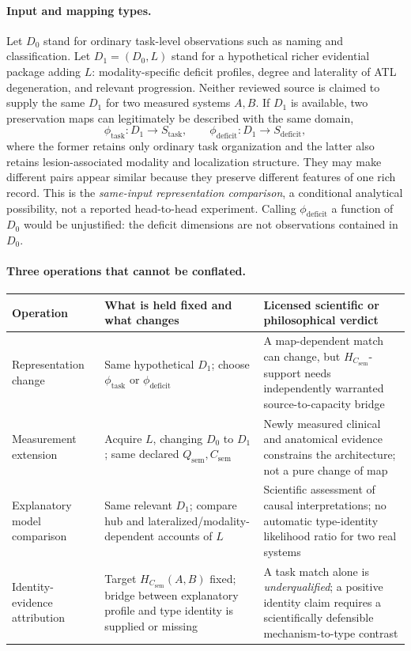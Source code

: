 \documentclass[11pt]{article}
\begin{document}
\paragraph{Input and mapping types.}
Let \(D_0\) stand for ordinary task-level observations such as naming and classification. Let \(D_1=(D_0,L)\) stand for a hypothetical richer evidential package adding \(L\): modality-specific deficit profiles, degree and laterality of ATL degeneration, and relevant progression. Neither reviewed source is claimed to supply the same \(D_1\) for two measured systems \(A,B\). If \(D_1\) is available, two preservation maps can legitimately be described with the same domain,
\[
\phi_{\mathrm{task}}:D_1\longrightarrow S_{\mathrm{task}},
\qquad
\phi_{\mathrm{deficit}}:D_1\longrightarrow S_{\mathrm{deficit}},
\]
where the former retains only ordinary task organization and the latter also retains lesion-associated modality and localization structure. They may make different pairs appear similar because they preserve different features of one rich record. This is the \emph{same-input representation comparison}, a conditional analytical possibility, not a reported head-to-head experiment. Calling \(\phi_{\mathrm{deficit}}\) a function of \(D_0\) would be unjustified: the deficit dimensions are not observations contained in \(D_0\).

\paragraph{Three operations that cannot be conflated.}
\begin{center}
\small
\begin{tabularx}{\textwidth}{>{\raggedright\arraybackslash}p{} X X}
\toprule
Operation & What is held fixed and what changes & Licensed scientific or philosophical verdict\\
\midrule
Representation change & Same hypothetical \(D_1\); choose \(\phi_{\mathrm{task}}\) or \(\phi_{\mathrm{deficit}}\) & A map-dependent match can change, but \(H_{C_{\mathrm{sem}}}\)-support needs independently warranted source-to-capacity bridge\\
Measurement extension & Acquire \(L\), changing \(D_0\) to \(D_1\); same declared \(Q_{\mathrm{sem}},C_{\mathrm{sem}}\) & Newly measured clinical and anatomical evidence constrains the architecture; not a pure change of map\\
Explanatory model comparison & Same relevant \(D_1\); compare hub and lateralized/modality-dependent accounts of \(L\) & Scientific assessment of causal interpretations; no automatic type-identity likelihood ratio for two real systems\\
Identity-evidence attribution & Target \(H_{C_{\mathrm{sem}}}(A,B)\) fixed; bridge between explanatory profile and type identity is supplied or missing & A task match alone is \emph{underqualified}; a positive identity claim requires a scientifically defensible mechanism-to-type contrast\\
\bottomrule
\end{tabularx}
\end{center}
\end{document}
